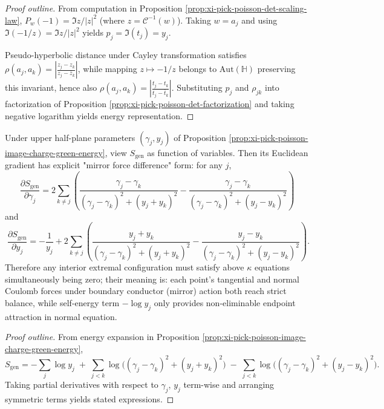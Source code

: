 \begin{proof}[Proof outline]
From computation in Proposition \ref{prop:xi-pick-poisson-det-scaling-law},
\(
P_w(-1)=\Im z/|z|^2
\) (where \(z=\mathcal{C}^{-1}(w)\)).
Taking \(w=a_j\) and using \(\Im(-1/z)=\Im z/|z|^2\) yields \(p_j=\Im(t_j)=y_j\).
\par
Pseudo-hyperbolic distance under Cayley transformation satisfies \(\rho(a_j,a_k)=\left|\frac{z_j-z_k}{z_j-\overline z_k}\right|\), while mapping \(z\mapsto -1/z\) belongs to \(\mathrm{Aut}(\mathbb{H})\) preserving this invariant, hence also \(\rho(a_j,a_k)=\left|\frac{t_j-t_k}{t_j-\overline t_k}\right|\).
Substituting \(p_j\) and \(\rho_{jk}\) into factorization of Proposition \ref{prop:xi-pick-poisson-det-factorization} and taking negative logarithm yields energy representation.
\end{proof}

\begin{proposition}\label{prop:xi-pick-poisson-energy-balance-equations}
Under upper half-plane parameters \((\gamma_j,y_j)\) of Proposition \ref{prop:xi-pick-poisson-image-charge-green-energy}, view \(S_{\mathrm{gen}}\) as function of variables.
Then its Euclidean gradient has explicit "mirror force difference" form: for any \(j\),
\[
\boxed{\;
\frac{\partial S_{\mathrm{gen}}}{\partial \gamma_j}
=
2\sum_{k\neq j}\left(
\frac{\gamma_j-\gamma_k}{(\gamma_j-\gamma_k)^2+(y_j+y_k)^2}
-
\frac{\gamma_j-\gamma_k}{(\gamma_j-\gamma_k)^2+(y_j-y_k)^2}
\right)\;}
\]
and
\[
\boxed{\;
\frac{\partial S_{\mathrm{gen}}}{\partial y_j}
=
-\frac{1}{y_j}
+
2\sum_{k\neq j}\left(
\frac{y_j+y_k}{(\gamma_j-\gamma_k)^2+(y_j+y_k)^2}
-
\frac{y_j-y_k}{(\gamma_j-\gamma_k)^2+(y_j-y_k)^2}
\right).\;}
\]
Therefore any interior extremal configuration must satisfy above \(\kappa\) equations simultaneously being zero; their meaning is: each point's tangential and normal Coulomb forces under boundary conductor (mirror) action both reach strict balance, while self-energy term \(-\log y_j\) only provides non-eliminable endpoint attraction in normal equation.
\end{proposition}
\begin{proof}[Proof outline]
From energy expansion in Proposition \ref{prop:xi-pick-poisson-image-charge-green-energy},
\[
S_{\mathrm{gen}}
=-\sum_j\log y_j
\;+\;\sum_{j<k}\log\!\bigl((\gamma_j-\gamma_k)^2+(y_j+y_k)^2\bigr)
\;-\;\sum_{j<k}\log\!\bigl((\gamma_j-\gamma_k)^2+(y_j-y_k)^2\bigr).
\]
Taking partial derivatives with respect to \(\gamma_j\), \(y_j\) term-wise and arranging symmetric terms yields stated expressions.
\end{proof}


